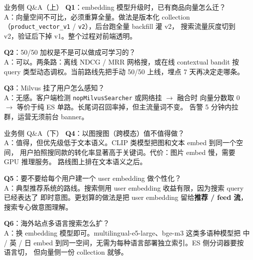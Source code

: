 \begin{frame}{业务侧 Q\&A（上）}
\textbf{Q1}：embedding 模型升级时，已有商品向量怎么迁？\\
\hspace{4mm}\small A：向量空间不可比，必须重算全量。做法是版本化 collection
（\texttt{product\_vector\_v1} / \texttt{v2}），后台跑全量 backfill 灌 v2，
搜索流量灰度切到 v2，验证后下掉 v1。整个过程对前端透明。

\vspace{2mm}
\textbf{Q2}：50/50 加权是不是可以做成可学习的？\\
\hspace{4mm}\small A：可以。两条路：离线 NDCG / MRR 网格搜，或在线 contextual bandit
按 query 类型动态调权。当前路线先把手动 50/50 上线，埋点 7 天再决定走哪条。

\vspace{2mm}
\textbf{Q3}：Milvus 挂了用户怎么感知？\\
\hspace{4mm}\small A：无感。客户端检测 \texttt{nopMilvusSearcher} 或网络挂 $\to$ 融合时
向量分数取 0 $\to$ 等价于纯 ES 单路。长尾词召回率掉，但主流量词不变。
告警 5 分钟内拉群，运营无须前台 banner。
\end{frame}

\begin{frame}{业务侧 Q\&A（下）}
\textbf{Q4}：以图搜图（跨模态）值不值得做？\\
\hspace{4mm}\small A：值得，但优先级低于文本语义。CLIP 类模型把图和文本 embed 到同一个空间，
用户拍照搜同款的转化率显著高于关键词。代价：图片 embed 慢，需要 GPU 推理服务。
路线图上排在文本语义之后。

\vspace{2mm}
\textbf{Q5}：要不要给每个用户建一个 user embedding 做个性化？\\
\hspace{4mm}\small A：典型推荐系统的路线。搜索侧用 user embedding 收益有限，因为搜索 query 已经表达了
即时意图。更划算的做法是把 user embedding 留给\textbf{推荐 / feed 流}，搜索专心做意图理解。

\vspace{2mm}
\textbf{Q6}：海外站点多语言搜索怎么扩？\\
\hspace{4mm}\small A：换 embedding 模型即可。multilingual-e5-large、bge-m3 这类多语种模型把
中 / 英 / 日 embed 到同一空间，无需为每种语言部署独立索引。ES 侧分词器要按语言切，
但向量侧一份 collection 就够。
\end{frame}

